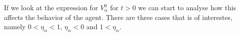 % 
% 
% 
% 
% 
% 
% 
% 
% 
% 

If we look at the expression for $V_{\alpha}^{0}$ for $t>0$ we can 
start to analyse how this affects the behavior of the agent. There 
are three cases that is of interestes, namely $0 < \eta_{\alpha} < 1$, 
$\eta_{\alpha} < 0$ and $1 < \eta_{\alpha} $.

